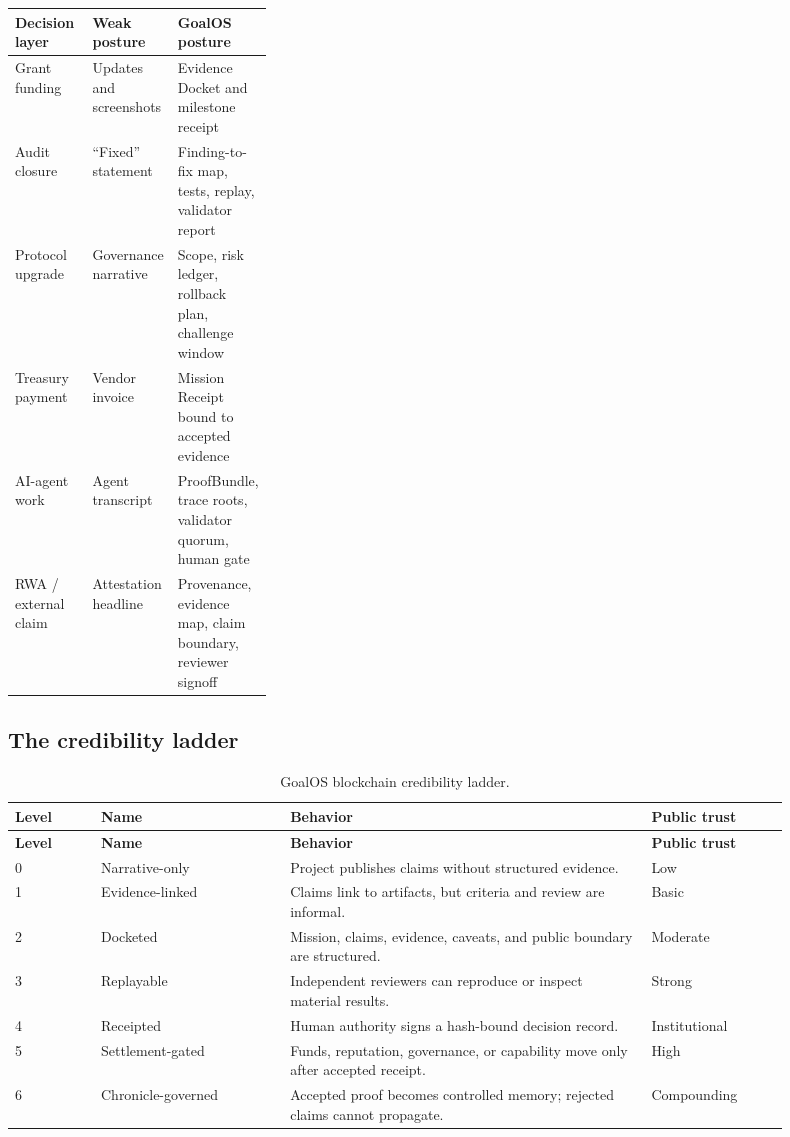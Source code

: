 \begin{center}
\begin{tabularx}{0.96\linewidth}{p{0.30\linewidth} X X}
\toprule
\textbf{Decision layer} & \textbf{Weak posture} & \textbf{GoalOS posture}\\
\midrule
Grant funding & Updates and screenshots & Evidence Docket and milestone receipt\\
Audit closure & ``Fixed'' statement & Finding-to-fix map, tests, replay, validator report\\
Protocol upgrade & Governance narrative & Scope, risk ledger, rollback plan, challenge window\\
Treasury payment & Vendor invoice & Mission Receipt bound to accepted evidence\\
AI-agent work & Agent transcript & ProofBundle, trace roots, validator quorum, human gate\\
RWA / external claim & Attestation headline & Provenance, evidence map, claim boundary, reviewer signoff\\
\bottomrule
\end{tabularx}
\end{center}

\subsection{The credibility ladder}

\begin{longtable}{p{0.10\linewidth} p{0.22\linewidth} p{0.42\linewidth} p{0.16\linewidth}}
\caption{GoalOS blockchain credibility ladder.}\\
\toprule
\textbf{Level} & \textbf{Name} & \textbf{Behavior} & \textbf{Public trust}\\
\midrule
\endfirsthead
\toprule
\textbf{Level} & \textbf{Name} & \textbf{Behavior} & \textbf{Public trust}\\
\midrule
\endhead
0 & Narrative-only & Project publishes claims without structured evidence. & Low\\
1 & Evidence-linked & Claims link to artifacts, but criteria and review are informal. & Basic\\
2 & Docketed & Mission, claims, evidence, caveats, and public boundary are structured. & Moderate\\
3 & Replayable & Independent reviewers can reproduce or inspect material results. & Strong\\
4 & Receipted & Human authority signs a hash-bound decision record. & Institutional\\
5 & Settlement-gated & Funds, reputation, governance, or capability move only after accepted receipt. & High\\
6 & Chronicle-governed & Accepted proof becomes controlled memory; rejected claims cannot propagate. & Compounding\\
\bottomrule
\end{longtable}

